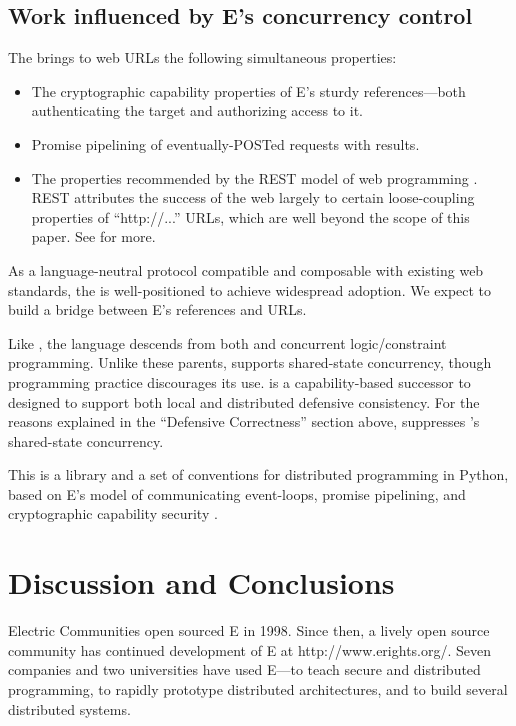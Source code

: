 \documentclass{llncs}
\begin{document}
\subsection{Work influenced by E's concurrency control}

 The  \cite{tyler:webcalc}
brings to web URLs the following simultaneous properties:
%
\begin{itemize}
\item The cryptographic capability properties of E's sturdy
  references---both authenticating the target and authorizing access
  to it.
\item Promise pipelining of eventually-POSTed requests with results.
\item The properties recommended by the REST model of web programming
  \cite{fielding:rest}. REST attributes the success of the web largely
  to certain loose-coupling properties of ``http://...''  URLs, which
  are well beyond the scope of this paper. See
  \cite{fielding:rest,tyler:webcalc} for more.
\end{itemize}
%
As a language-neutral protocol compatible and composable with existing
web standards, the  is well-positioned 
to achieve widespread adoption. We expect to build a bridge between
E's references and  URLs.

 Like , the  language
\cite{VanRoyHaridi} descends from both  and concurrent
logic/constraint programming. Unlike these parents,  supports
shared-state concurrency, though  programming practice
discourages its use.  \cite{oze} is a capability-based
successor to  designed to support both local and distributed
defensive consistency. For the reasons explained in the ``Defensive
Correctness'' section above,  suppresses 's
shared-state concurrency.

 This is a library and a set of
conventions for distributed programming in Python, based on E's model
of communicating event-loops, promise pipelining, and cryptographic
capability security \cite{twisted}.

\section{Discussion and Conclusions}

Electric Communities open sourced E in 1998. Since then, a lively open
source community has continued development of E at
http://www.erights.org/. Seven companies and two universities have
used E---to teach secure and distributed programming, to rapidly
prototype distributed architectures, and to build several distributed
systems.
\end{document}
